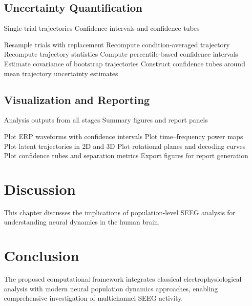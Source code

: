 \documentclass[11pt]{report}
\begin{document}
\section{Uncertainty Quantification}

\begin{algorithm}[H]
\caption{Bootstrap uncertainty estimation}
\begin{algorithmic}[1]
\Require Single-trial trajectories
\Ensure Confidence intervals and confidence tubes

    \State Resample trials with replacement
    \State Recompute condition-averaged trajectory
    \State Recompute trajectory statistics
\EndFor
\State Compute percentile-based confidence intervals
\State Estimate covariance of bootstrap trajectories
\State Construct confidence tubes around mean trajectory
\State \Return uncertainty estimates
\end{algorithmic}
\end{algorithm}

\section{Visualization and Reporting}

\begin{algorithm}[H]
\caption{Visualization of neural dynamics}
\begin{algorithmic}[1]
\Require Analysis outputs from all stages
\Ensure Summary figures and report panels

\State Plot ERP waveforms with confidence intervals
\State Plot time--frequency power maps
\State Plot latent trajectories in 2D and 3D
\State Plot rotational planes and decoding curves
\State Plot confidence tubes and separation metrics
\State Export figures for report generation
\end{algorithmic}
\end{algorithm}



\chapter{Discussion}

This chapter discusses the implications of population-level
SEEG analysis for understanding neural dynamics in the human brain.

\chapter{Conclusion}

The proposed computational framework integrates classical
electrophysiological analysis with modern neural population
dynamics approaches, enabling comprehensive investigation of
multichannel SEEG activity.
\end{document}
